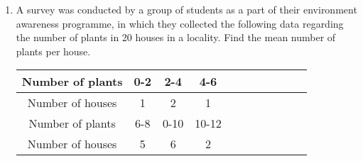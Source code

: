 \renewcommand{\theequation}{\theenumi}
\begin{enumerate}[label=\arabic*.,ref=\thesubsection.\theenumi]
\item A survey was conducted by a group of students as a part of their environment awareness
programme, in which they collected the following data regarding the number of plants in
20 houses in a locality. Find the mean number of plants per house.\\
\begin{tabular}{|c|c|c|c|c|c|c||c|c|c|c|}
	\hline
	Number of plants &0-2&2-4&4-6\\
	\hline
	Number of houses &1&2&1\\
	\hline
	Number of plants &6-8&0-10&10-12\\
	\hline
	Number of houses&5&6&2\\
	\hline
\end{tabular}
\end{enumerate}